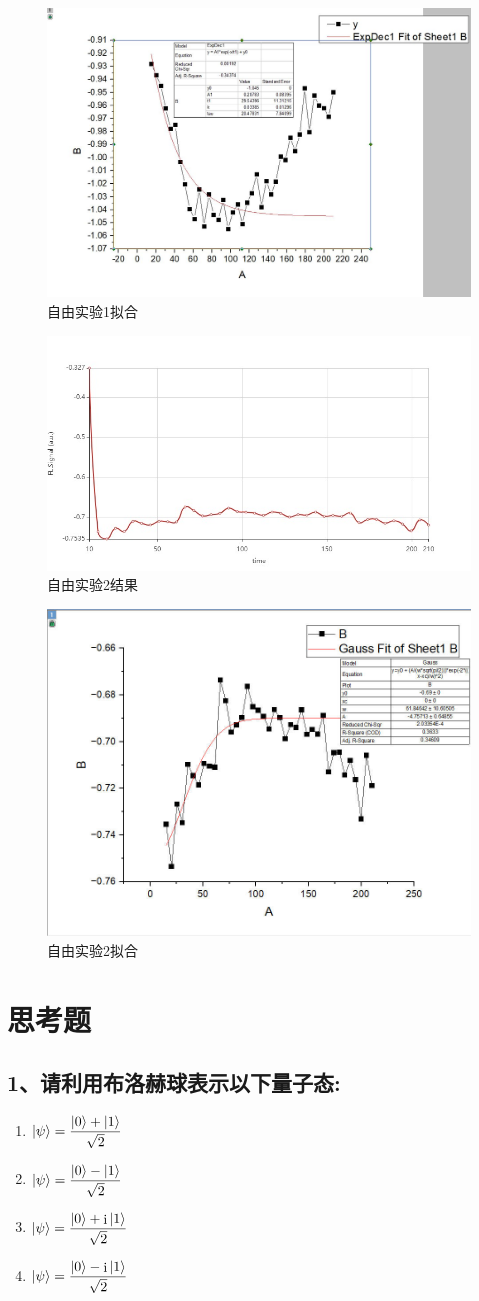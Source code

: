 \documentclass[a4paper]{article}
\DeclareMathOperator{\I}{\mathrm{i}}
\begin{document}
\begin{figure}[htbp]
	\centering
	\includegraphics[width=0.4\linewidth]{data/free/1.JPG}
	\caption{自由实验1拟合}
	\label{fig:s62}
\end{figure}

\begin{figure}[htbp]
	\centering
	\includegraphics[width=0.4\linewidth]{data/free/Free -2024-06-07-19-23-34.jpeg}
	\caption{自由实验2结果}
	\label{fig:s63}
\end{figure}

\begin{figure}[htbp]
	\centering
	\includegraphics[width=0.4\linewidth]{data/free/2.JPG}
	\caption{自由实验2拟合}
	\label{fig:s64}
\end{figure}

\section{思考题}
\subsection*{1、请利用布洛赫球表示以下量子态:}
\begin{enumerate}
	\item $ \ket{\psi} = \dfrac{\ket{0} + \ket{1}}{\sqrt{2}} $
	\item $ \ket{\psi} = \dfrac{\ket{0} - \ket{1}}{\sqrt{2}} $
	\item $ \ket{\psi} = \dfrac{\ket{0} + \I\ket{1}}{\sqrt{2}} $
	\item $ \ket{\psi} = \dfrac{\ket{0} - \I\ket{1}}{\sqrt{2}} $
\end{enumerate}
\end{document}
